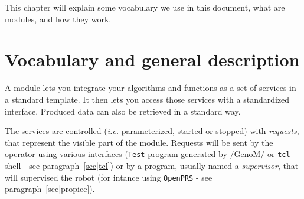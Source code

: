 %
%
%
%
%
%
%

This chapter will explain some vocabulary we use in this document, what
are modules, and how they work.


\section{Vocabulary and general description}
\label{sec|module|voc}

A module lets  you integrate your  algorithms and functions  as  a set of
services in a  standard template. It then lets  you access those services
with a standardized  interface. Produced data can  also be retrieved in a
standard way.

The services are controlled (\emph{i.e.} parameterized, started or stopped)
with  \emph{requests},  that  represent  the    visible  part   of   the
module. Requests  will be sent by the operator using various interfaces
(\texttt{Test} program  generated   by /GenoM/ or  \texttt{tcl}  shell  - see 
paragraph~\vref{sec|tcl})    or  by a  program,    usually  named a  
\emph{supervisor},  that  will supervised  the  robot  (for  intance using 
\texttt{OpenPRS} - see paragraph~\vref{sec|propice}).
 
